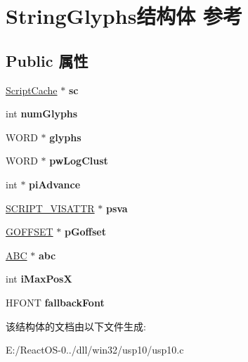 \hypertarget{struct_string_glyphs}{}\section{String\+Glyphs结构体 参考}
\label{struct_string_glyphs}
\subsection*{Public 属性}
\begin{DoxyCompactItemize}
\item 
\mbox{\label{struct_string_glyphs_a873ba4a9af5c2a744a57aa719919bc47}} 
\hyperlink{struct_script_cache}{Script\+Cache} $\ast$ {\bfseries sc}
\item 
\mbox{\label{struct_string_glyphs_acec68015552819b77dc1a10fd44955b5}} 
int {\bfseries num\+Glyphs}
\item 
\mbox{\label{struct_string_glyphs_a462d8ca45b0234cab5ded43fa705f6e4}} 
W\+O\+RD $\ast$ {\bfseries glyphs}
\item 
\mbox{\label{struct_string_glyphs_a28d35753473e892dd8a55f1b8cd523a1}} 
W\+O\+RD $\ast$ {\bfseries pw\+Log\+Clust}
\item 
\mbox{\label{struct_string_glyphs_ab605a47525846a12ce3c02ff19948f47}} 
int $\ast$ {\bfseries pi\+Advance}
\item 
\mbox{\label{struct_string_glyphs_a0a0dc158b5fc0869e1f7f67119b78ea6}} 
\hyperlink{structtag___s_c_r_i_p_t___v_i_s_a_t_t_r}{S\+C\+R\+I\+P\+T\+\_\+\+V\+I\+S\+A\+T\+TR} $\ast$ {\bfseries psva}
\item 
\mbox{\label{struct_string_glyphs_aebf436b918ade4d0050cb14e4fb5a087}} 
\hyperlink{structtag_g_o_f_f_s_e_t}{G\+O\+F\+F\+S\+ET} $\ast$ {\bfseries p\+Goffset}
\item 
\mbox{\label{struct_string_glyphs_af26579fe12cf22020cdd31fb918ff856}} 
\hyperlink{struct___a_b_c}{A\+BC} $\ast$ {\bfseries abc}
\item 
\mbox{\label{struct_string_glyphs_a2355a3db800e67d4f71036d9258f4ea5}} 
int {\bfseries i\+Max\+PosX}
\item 
\mbox{\label{struct_string_glyphs_a3fea14eb7ab50943bda666831ebe1a96}} 
H\+F\+O\+NT {\bfseries fallback\+Font}
\end{DoxyCompactItemize}


该结构体的文档由以下文件生成\+:\begin{DoxyCompactItemize}
\item 
E\+:/\+React\+O\+S-\/0../dll/win32/usp10/usp10.\+c\end{DoxyCompactItemize}
